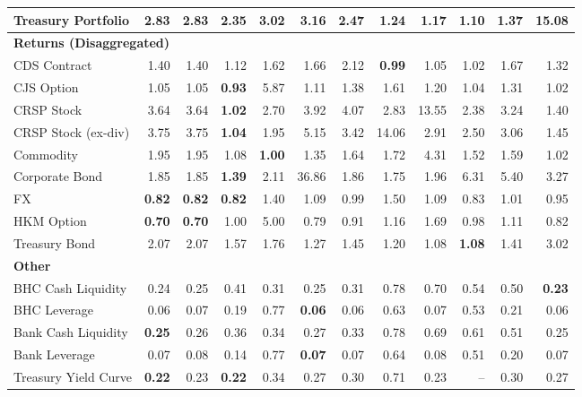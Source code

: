 \begin{table}[htbp]
\begin{tabular}{@{}lrrrrrrrrrrr@{}}
Treasury Portfolio & 2.83 & 2.83 & 2.35 & 3.02 & 3.16 & 2.47 & 1.24 & 1.17 & \textbf{1.10} & 1.37 & 15.08 \\
\midrule
\multicolumn{12}{l}{\textbf{Returns (Disaggregated)}} \\
CDS Contract & 1.40 & 1.40 & 1.12 & 1.62 & 1.66 & 2.12 & \textbf{0.99} & 1.05 & 1.02 & 1.67 & 1.32 \\
CJS Option & 1.05 & 1.05 & \textbf{0.93} & 5.87 & 1.11 & 1.38 & 1.61 & 1.20 & 1.04 & 1.31 & 1.02 \\
CRSP Stock & 3.64 & 3.64 & \textbf{1.02} & 2.70 & 3.92 & 4.07 & 2.83 & 13.55 & 2.38 & 3.24 & 1.40 \\
CRSP Stock (ex-div) & 3.75 & 3.75 & \textbf{1.04} & 1.95 & 5.15 & 3.42 & 14.06 & 2.91 & 2.50 & 3.06 & 1.45 \\
Commodity & 1.95 & 1.95 & 1.08 & \textbf{1.00} & 1.35 & 1.64 & 1.72 & 4.31 & 1.52 & 1.59 & 1.02 \\
Corporate Bond & 1.85 & 1.85 & \textbf{1.39} & 2.11 & 36.86 & 1.86 & 1.75 & 1.96 & 6.31 & 5.40 & 3.27 \\
FX & \textbf{0.82} & \textbf{0.82} & \textbf{0.82} & 1.40 & 1.09 & 0.99 & 1.50 & 1.09 & 0.83 & 1.01 & 0.95 \\
HKM Option & \textbf{0.70} & \textbf{0.70} & 1.00 & 5.00 & 0.79 & 0.91 & 1.16 & 1.69 & 0.98 & 1.11 & 0.82 \\
Treasury Bond & 2.07 & 2.07 & 1.57 & 1.76 & 1.27 & 1.45 & 1.20 & 1.08 & \textbf{1.08} & 1.41 & 3.02 \\
\midrule
\multicolumn{12}{l}{\textbf{Other}} \\
BHC Cash Liquidity & 0.24 & 0.25 & 0.41 & 0.31 & 0.25 & 0.31 & 0.78 & 0.70 & 0.54 & 0.50 & \textbf{0.23} \\
BHC Leverage & 0.06 & 0.07 & 0.19 & 0.77 & \textbf{0.06} & 0.06 & 0.63 & 0.07 & 0.53 & 0.21 & 0.06 \\
Bank Cash Liquidity & \textbf{0.25} & 0.26 & 0.36 & 0.34 & 0.27 & 0.33 & 0.78 & 0.69 & 0.61 & 0.51 & 0.25 \\
Bank Leverage & 0.07 & 0.08 & 0.14 & 0.77 & \textbf{0.07} & 0.07 & 0.64 & 0.08 & 0.51 & 0.20 & 0.07 \\
Treasury Yield Curve & \textbf{0.22} & 0.23 & \textbf{0.22} & 0.34 & 0.27 & 0.30 & 0.71 & 0.23 & -- & 0.30 & 0.27 \\
\bottomrule
\end{tabular}
\vspace{0.1cm}

\end{table}
